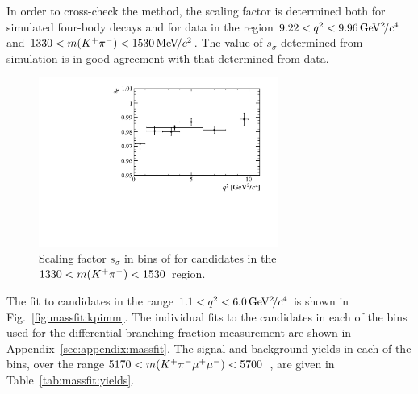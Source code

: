 In order to cross-check the method, the scaling factor is determined both for simulated four-body \BdToKpimm decays and for data in the region $9.22<{q^2}<9.96{\mathrm{\,Ge\kern -0.1em V^2\!/}c^4}$ and $1330<m({{K}^+}{{\pi}^-})<1530{\mathrm{\,Me\kern -0.1em V\!/}c^2}$.  The value of $s_{\sigma}$ determined from simulation is in good agreement with that determined from data.

\begin{figure}[!tb]
 \centering
 \includegraphics[width=0.7\textwidth]{figs/kpimm/massfit/s_sigma.pdf}
 \caption{Scaling factor $s_{\sigma}$ in bins of \qsq for candidates in the $1330<m({{K}^+}{{\pi}^-})<1530$~\mevcc region.
 \label{fig:massfit:scale}}
\end{figure}


 The fit to \BdToKpimm candidates in the range $1.1 < {q^2} < 6.0{\mathrm{\,Ge\kern -0.1em V^2\!/}c^4}$ is shown in Fig.~\ref{fig:massfit:kpimm}.  The individual fits to the \BdToKpimm candidates in each of the \qsq bins used for the differential branching fraction measurement are shown in Appendix~\ref{sec:appendix:massfit}. The signal and background yields in each of the \qsq bins, over the range $5170<m({{K}^+}{{\pi}^-}{\mu^+}{\mu^-})<5700$~\mevcc, are given in Table~\ref{tab:massfit:yields}.

